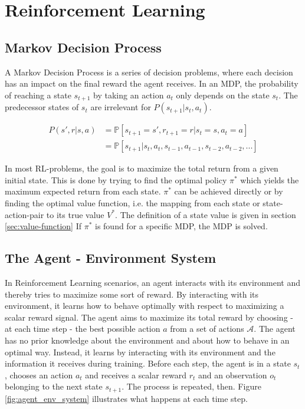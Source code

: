 \chapter{Reinforcement Learning}

\section{Markov Decision Process}

A Markov Decision Process is a series of decision problems, where each decision has an impact on the final reward the agent receives. In an MDP, the probability of reaching a state $s_{t+1}$ by taking an action $a_t$ only depends on the state $s_t$. The predecessor states of $s_t$ are irrelevant for $P(s_{t+1}|s_t,a_t)$.

\begin{align}
P(s',r|s,a)&=\mathbb{P}[s_{t+1}=s',r_{t+1}=r|s_t=s,a_t=a] \\
&= \mathbb{P}[s_{t+1}|s_t,a_t,s_{t-1},a_{t-1},s_{t-2},a_{t-2},...]
\end{align}

In most RL-problems, the goal is to maximize the total return from a given initial state. This is done by trying to find the optimal policy $\pi^*$ which yields the maximum expected return from each state. $\pi^*$ can be achieved directly or by finding the optimal value function, i.e. the mapping from each state or state-action-pair to its true value $V^*$. The definition of a state value is given in section \ref{sec:value-function} If $\pi^*$ is found for a specific MDP, the MDP is solved.

\section{The Agent - Environment System}

In Reinforcement Learning scenarios, an agent interacts with its environment and thereby tries to maximize some sort of reward. By interacting with its environment, it learns how to behave optimally with respect to maximizing a scalar reward signal. The agent aims to maximize its total reward by choosing - at each time step - the best possible action $a$ from a set of actions $\mathcal{A}$. 
The agent has no prior knowledge about the environment and about how to behave in an optimal way. Instead, it learns by interacting with its environment and the information it receives during training. Before each step, the agent is in a state $s_t$, chooses an action $a_t$ and receives a scalar reward $r_t$ and an observation $o_t$ belonging to the next state $s_{t+1}$. The process is repeated, then. Figure \ref{fig:agent_env_system} illustrates what happens at each time step.

